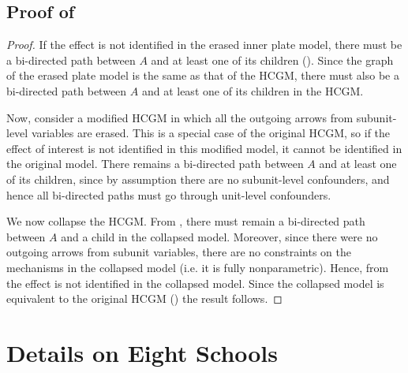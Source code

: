 \documentclass[12pt]{article}
\begin{document}
\subsection{Proof of } \label{proof:unit-level-noID}
\begin{proof}
If the effect is not identified in the erased inner plate model, there must be a bi-directed path between $A$ and at least one of its children ().
Since the graph of the erased plate model is the same as that of the HCGM, there must also be a bi-directed path between $A$ and at least one of its children in the HCGM.

Now, consider a modified HCGM in which all the outgoing arrows from subunit-level variables are erased. 
This is a special case of the original HCGM, so if the effect of interest is not identified in this modified model, it cannot be identified in the original model.
There remains a bi-directed path between $A$ and at least one of its children, since by assumption there are no subunit-level confounders, and hence all bi-directed paths must go through unit-level confounders.

We now collapse the HCGM. From , there must remain a bi-directed path between $A$ and a child in the collapsed model. Moreover, since there were no outgoing arrows from subunit variables, there are no constraints on the mechanisms in the collapsed model (i.e. it is fully nonparametric).
Hence, from  the effect is not identified in the collapsed model.
Since the collapsed model is equivalent to the original HCGM () the result follows.
\end{proof}
 
\section{Details on Eight Schools} \label{apx:schools_details}
\end{document}
